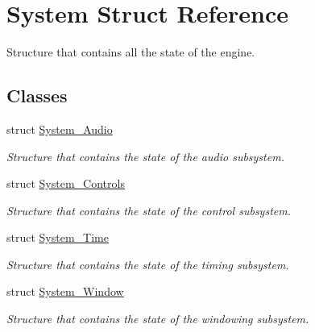 \hypertarget{structSystem}{}\section{System Struct Reference}
\label{structSystem}


Structure that contains all the state of the engine.  


\subsection*{Classes}
\begin{DoxyCompactItemize}
\item 
struct \mbox{\hyperlink{structSystem_1_1System__Audio}{System\+\_\+\+Audio}}
\begin{DoxyCompactList}\small\item\em Structure that contains the state of the audio subsystem. \end{DoxyCompactList}\item 
struct \mbox{\hyperlink{structSystem_1_1System__Controls}{System\+\_\+\+Controls}}
\begin{DoxyCompactList}\small\item\em Structure that contains the state of the control subsystem. \end{DoxyCompactList}\item 
struct \mbox{\hyperlink{structSystem_1_1System__Time}{System\+\_\+\+Time}}
\begin{DoxyCompactList}\small\item\em Structure that contains the state of the timing subsystem. \end{DoxyCompactList}\item 
struct \mbox{\hyperlink{structSystem_1_1System__Window}{System\+\_\+\+Window}}
\begin{DoxyCompactList}\small\item\em Structure that contains the state of the windowing subsystem. \end{DoxyCompactList}\end{DoxyCompactItemize}
